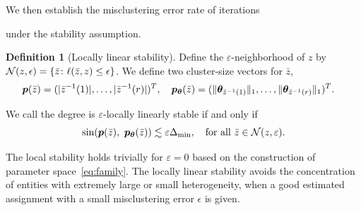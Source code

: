 \documentclass[lettersize,onecolumn,journal]{IEEEtran}
\theoremstyle{definition}
\theoremstyle{definition}
\newtheorem{defn}{Definition}
\begin{document}
We then establish the misclustering error rate of iterations 
{ \color{blue} under the stability assumption.

\begin{defn}[Locally linear stability] \label{def:stable}
Define the $\varepsilon$-neighborhood of $z$ by $\mathcal{N}(z,\epsilon)=\{\bar z\colon \ell(\bar z, z)\leq \epsilon\}$. We define two cluster-size vectors for $\bar z$,
\begin{align}
    &\bm{p}(\bar z)=(|\bar z^{-1}(1)|, \ldots,|\bar z^{-1}(r)|)^T, \quad \bm{p}_{\boldsymbol{\theta}}(\bar z)=(\lVert\boldsymbol{\theta}_{\bar z^{-1}(1)}\rVert_1,\ldots,\lVert\boldsymbol{\theta}_{\bar z^{-1}(r)}\rVert_1)^T.
\end{align}

We call the degree is $\varepsilon$-locally linearly stable if and only if 
\begin{equation}
    \sin(\bm{p}(\bar z),\ \bm{p}_{\boldsymbol{\theta}}(\bar z))\lesssim \varepsilon \Delta_{\min} ,\quad \text{for all } \bar z\in \mathcal{N}(z, \varepsilon).
\end{equation}
\end{defn}
}

The local stability holds trivially for $\varepsilon=0$ based on the construction of parameter space~\eqref{eq:family}. {\color{blue} The locally linear stability avoids the concentration of entities with extremely large or small heterogeneity, when a good estimated assignment with a small misclustering error $\epsilon$ is given.   }
 
\end{document}
